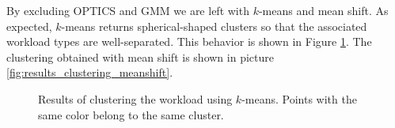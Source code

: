 \documentclass[a4paper, 12pt]{article} %
\begin{document}
	By excluding OPTICS and GMM we are left with $k$-means and mean shift. As expected, $k$-means returns spherical-shaped clusters so that the associated workload types are well-separated. This behavior is shown in Figure \ref{fig:results_clustering_kmeans}. The clustering obtained with mean shift is shown in picture \ref{fig:results_clustering_meanshift}.
	
	\begin{figure}\centering
		 \hfill
		
		\caption{Results of clustering the workload using $k$-means. Points with the same color belong to the same cluster.}
		\label{fig:results_clustering_kmeans}
	\end{figure}
	
\end{document}
